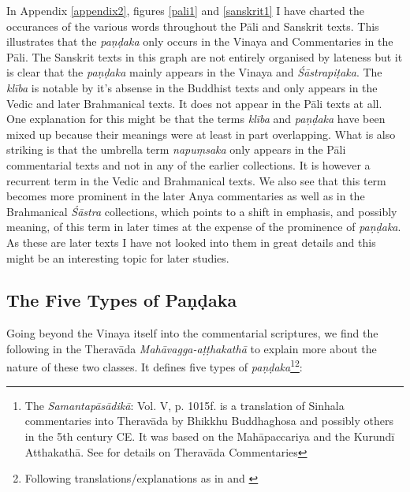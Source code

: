 In Appendix \ref{appendix2}, figures \ref{pali1} and \ref{sanskrit1} I have charted the occurances of the various words throughout the Pāli and Sanskrit texts. This illustrates that the {\em paṇḍaka} only occurs in the Vinaya and Commentaries in the Pāli. The Sanskrit texts in this graph are not entirely organised by lateness but it is clear that the {\em paṇḍaka} mainly appears in the Vinaya and {\em Śāstrapiṭaka}. The {\em klība} is notable by it's absense in the Buddhist texts and only appears in the Vedic and later Brahmanical texts. It does not appear in the Pāli texts at all. One explanation for this might be that the terms {\em klība} and {\em paṇḍaka} have been mixed up because their meanings were at least in part overlapping. What is also striking is that the umbrella term {\em napuṃsaka} only appears in the Pāli commentarial texts and not in any of the earlier collections. It is however a recurrent term in the Vedic and Brahmanical texts. We also see that this term becomes more prominent in the later Anya commentaries as well as in the Brahmanical {\em Śāstra} collections, which points to a shift in emphasis, and possibly meaning, of this term in later times at the expense of the prominence of {\em paṇḍaka}. As these are later texts I have not looked into them in great details and this might be an interesting topic for later studies.


\subsection{The Five Types of Paṇḍaka}
Going beyond the Vinaya itself into the commentarial scriptures, we find the following in the Theravāda {\em Mahāvagga-aṭṭhakathā} to explain more about the nature of these two classes. It defines five types of {\em paṇḍaka}\footnote{The {\em Samantapāsādikā}: Vol. V, p. 1015f. is a translation of Sinhala commentaries into Theravāda by Bhikkhu Buddhaghosa and possibly others in the 5th century CE. It was based on the Mahāpaccariya and the Kurundī Atthakathā. See \cite{goonesekere} for details on Theravāda Commentaries}\footnote{Following translations/explanations as in \cite{bomhard} and \cite{thanissaro}}:

